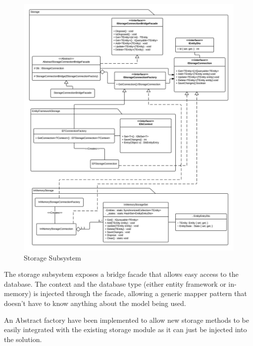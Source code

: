 \begin{figure}[H]
\includegraphics[width=\linewidth]{img/SDD/StoragePackage.png}
\caption{Storage Subsystem}
\label{fig:StorageSubsystem}
\end{figure}

The storage subsystem exposes a bridge facade that allows easy access to the database. The context and the database type (either entity framework or in-memory) is injected through the facade, allowing a generic mapper pattern that doesn't have to know anything about the model being used.

An Abstract factory have been implemented to allow new storage methods to be easily integrated with the existing storage module as it can just be injected into the solution.

